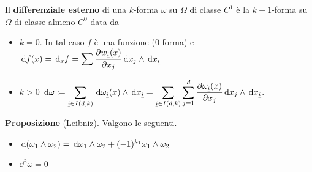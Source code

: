 Il \textbf{differenziale esterno} di una $k$-forma $\omega$ su $\Omega$ di classe $C^1$ è la $k+1$-forma su $\Omega$ di classe almeno $C^0$ data da
\begin{itemize}

	\item $k=0$. In tal caso $f$ è una funzione (0-forma) e $\displaystyle \,\mathrm{d} f(x) = \,\mathrm{d}_x f = \sum \frac{\partial w_{\underline{i}}(x)}{\partial x_j} \,\mathrm{d} x_j \wedge \,\mathrm{d} x_{\underline{i}}$


	\item $k > 0$ $\displaystyle \,\mathrm{d} \omega \coloneqq \sum_{\underline{i} \in I(d,k)} \,\mathrm{d} \omega_{\underline{i}} (x) \wedge \,\mathrm{d} x_{\underline{i}} = \sum_{\underline{i} \in I(d,k)} \sum_{j=1}^d \frac{\partial \omega_{\underline{i}}(x)}{\partial x_j} \,\mathrm{d} x_j \wedge \,\mathrm{d} x_{\underline{i}}$.

\end{itemize}

\textbf{Proposizione} (Leibniz). Valgono le seguenti.
\begin{itemize}

	\item $\displaystyle \,\mathrm{d} (\omega_1 \wedge \omega_2) = \,\mathrm{d} \omega_1 \wedge \omega_2 + (-1)^{k_1} \omega_1 \wedge \omega_2$

	\item $\dd^2 \omega = 0$
\end{itemize}
